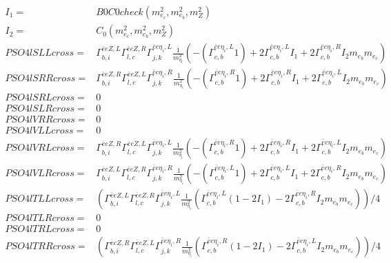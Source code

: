 \documentclass[A4,landscape]{article}
\begin{document}
\begin{align} 
I_1= & B0C0check(m^2_{e_{{c}}}, m^2_{e_{{b}}}, m^2_{Z}) \\ 
I_2= & C_0(m^2_{e_{{c}}}, m^2_{e_{{b}}}, m^2_{Z}) \\ 
  PSO4lSLLcross= &  \Gamma^{\bar{e}e Z ,L}_{b, i} \Gamma^{\bar{e}e Z ,R}_{l, c} \Gamma^{\bar{e}e \eta_i ,L}_{j, k} \frac{1}{m^2_{\eta_i}} (-(\Gamma^{\bar{e}e \eta_i ,L}_{c, b} 1) + 2 \Gamma^{\bar{e}e \eta_i ,L}_{c, b} I_1 + 2 \Gamma^{\bar{e}e \eta_i ,R}_{c, b} I_2 m_{e_{{b}}} m_{e_{{c}}}) \\ 
  PSO4lSRRcross= &  \Gamma^{\bar{e}e Z ,R}_{b, i} \Gamma^{\bar{e}e Z ,L}_{l, c} \Gamma^{\bar{e}e \eta_i ,R}_{j, k} \frac{1}{m^2_{\eta_i}} (-(\Gamma^{\bar{e}e \eta_i ,R}_{c, b} 1) + 2 \Gamma^{\bar{e}e \eta_i ,R}_{c, b} I_1 + 2 \Gamma^{\bar{e}e \eta_i ,L}_{c, b} I_2 m_{e_{{b}}} m_{e_{{c}}}) \\ 
  PSO4lSRLcross= & 0 \\ 
  PSO4lSLRcross= & 0 \\ 
  PSO4lVRRcross= & 0 \\ 
  PSO4lVLLcross= & 0 \\ 
  PSO4lVRLcross= &  \Gamma^{\bar{e}e Z ,R}_{b, i} \Gamma^{\bar{e}e Z ,L}_{l, c} \Gamma^{\bar{e}e \eta_i ,L}_{j, k} \frac{1}{m^2_{\eta_i}} (-(\Gamma^{\bar{e}e \eta_i ,R}_{c, b} 1) + 2 \Gamma^{\bar{e}e \eta_i ,R}_{c, b} I_1 + 2 \Gamma^{\bar{e}e \eta_i ,L}_{c, b} I_2 m_{e_{{b}}} m_{e_{{c}}}) \\ 
  PSO4lVLRcross= &  \Gamma^{\bar{e}e Z ,L}_{b, i} \Gamma^{\bar{e}e Z ,R}_{l, c} \Gamma^{\bar{e}e \eta_i ,R}_{j, k} \frac{1}{m^2_{\eta_i}} (-(\Gamma^{\bar{e}e \eta_i ,L}_{c, b} 1) + 2 \Gamma^{\bar{e}e \eta_i ,L}_{c, b} I_1 + 2 \Gamma^{\bar{e}e \eta_i ,R}_{c, b} I_2 m_{e_{{b}}} m_{e_{{c}}}) \\ 
  PSO4lTLLcross= & ( \Gamma^{\bar{e}e Z ,L}_{b, i} \Gamma^{\bar{e}e Z ,R}_{l, c} \Gamma^{\bar{e}e \eta_i ,L}_{j, k} \frac{1}{m^2_{\eta_i}} (\Gamma^{\bar{e}e \eta_i ,L}_{c, b} (1 - 2 I_1) - 2 \Gamma^{\bar{e}e \eta_i ,R}_{c, b} I_2 m_{e_{{b}}} m_{e_{{c}}}))/4 \\ 
  PSO4lTLRcross= & 0 \\ 
  PSO4lTRLcross= & 0 \\ 
  PSO4lTRRcross= & ( \Gamma^{\bar{e}e Z ,R}_{b, i} \Gamma^{\bar{e}e Z ,L}_{l, c} \Gamma^{\bar{e}e \eta_i ,R}_{j, k} \frac{1}{m^2_{\eta_i}} (\Gamma^{\bar{e}e \eta_i ,R}_{c, b} (1 - 2 I_1) - 2 \Gamma^{\bar{e}e \eta_i ,L}_{c, b} I_2 m_{e_{{b}}} m_{e_{{c}}}))/4 \\ 
\end{align} 
\end{document}
